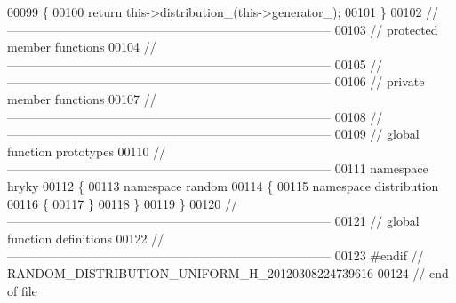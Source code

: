 \begin{DoxyCode}
00099 \{
00100     \textcolor{keywordflow}{return} this->distribution\_(this->generator\_);
00101 \}
00102 \textcolor{comment}{//
      ------------------------------------------------------------------------------}
00103 \textcolor{comment}{// protected member functions}
00104 \textcolor{comment}{//
      ------------------------------------------------------------------------------}
00105 \textcolor{comment}{//
      ------------------------------------------------------------------------------}
00106 \textcolor{comment}{// private member functions}
00107 \textcolor{comment}{//
      ------------------------------------------------------------------------------}
00108 \textcolor{comment}{//
      ------------------------------------------------------------------------------}
00109 \textcolor{comment}{// global function prototypes}
00110 \textcolor{comment}{//
      ------------------------------------------------------------------------------}
00111 \textcolor{keyword}{namespace }hryky
00112 \{
00113 \textcolor{keyword}{namespace }random
00114 \{
00115 \textcolor{keyword}{namespace }distribution
00116 \{
00117 \}
00118 \}
00119 \}
00120 \textcolor{comment}{//
      ------------------------------------------------------------------------------}
00121 \textcolor{comment}{// global function definitions}
00122 \textcolor{comment}{//
      ------------------------------------------------------------------------------}
00123 \textcolor{preprocessor}{#endif // RANDOM\_DISTRIBUTION\_UNIFORM\_H\_20120308224739616}
00124 \textcolor{preprocessor}{}\textcolor{comment}{// end of file}
\end{DoxyCode}
